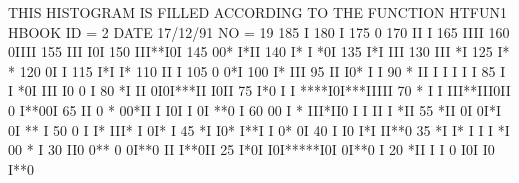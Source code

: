\begin{Listing}
 THIS HISTOGRAM IS FILLED ACCORDING TO THE FUNCTION HTFUN1                       
 HBOOK     ID =         2                                        DATE  17/12/91              NO =  19
      185                                    I
      180                                    I
      175                                    0
      170                                   II I
      165                                   IIII
      160                                   0IIII
      155                                 III I0I
      150                                 III**I0I
      145                                 00* I*II
      140                                 I*  I *0I
      135                                I*I    III
      130                               III      *I
      125                               I*        *
      120                               0I        I
      115                              I*I        I*
      110                              II          I
      105                              0           0*I
      100                             I*           III
       95                             II           I0* I                                I
       90                             *             II I                        I     I I  I
       85                             I             I *0I                       III  I0 0  I
       80                            *I                II                       0I0I***II I0II
       75                                             I*0                  I I  ****I0I***IIIII
       70                           *                 I I                  III**III0II 0 I**00I
       65                           II                0 *                  00*II I I0I I 0I **0 I
       60                           00                I  *               III*II0    I  I II I *II
       55                          *II                   0I              0I*I 0I               **   I
       50                          0 I                   I*            III*   I                0I*  I
       45                         *I                     I0*           I**I                    I 0* 0I
       40                          I                      I0          I*I                        II**0
       35                        *I                        I* I I I   *I                          00 *  I
       30                       II0                         0** 0 0I**0                           II I**0II
       25                      I*0I                         I0I*****I0I                               0I**0 I
       20                      *II                           I I 0 I0I                                I0 I**0

\end{Listing}
